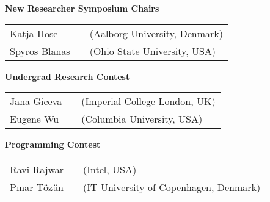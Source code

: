 {\vfill
\textbf{New Researcher Symposium Chairs}

\begin{tabular}{lp{.5em}l}
Katja Hose	&& \textsf{\footnotesize(Aalborg University, Denmark)}	\\
Spyros Blanas	&& \textsf{\footnotesize(Ohio State University, USA)}
\end{tabular}

\vfill
\textbf{Undergrad Research Contest}

\begin{tabular}{lp{.5em}l}
Jana Giceva	&& \textsf{\footnotesize(Imperial College London, UK)}	\\
Eugene Wu	&& \textsf{\footnotesize(Columbia University, USA)}
\end{tabular}

\vfill
\textbf{Programming Contest}

\begin{tabular}{lp{.5em}l}
Ravi Rajwar	&& \textsf{\footnotesize(Intel, USA)}	\\
Pınar Tözün	&& \textsf{\footnotesize(IT University of Copenhagen, Denmark)}
\end{tabular}

}

